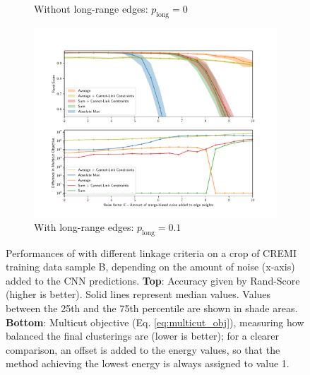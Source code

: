 \begin{figure}
\begin{subfigure}[t]{0.49 \textwidth}
        \caption{Without long-range edges: $p_{\mathrm{long}}=0$} \label{fig:merge_noise_only_direct}
    \end{subfigure} \hfill
    \begin{subfigure}[t]{0.49 \textwidth}
        \centering
        \includegraphics[width=\textwidth,trim=0.53in 0.35in 0.65in 0.80in,clip]{./figs/merge_noise_long_range.pdf}
        \caption{With long-range edges: $p_{\mathrm{long}}=0.1$} \label{fig:merge_noise_with_long_range}
    \end{subfigure}
\caption{Performances of \algname{} with different linkage criteria on a crop of CREMI training data sample B, depending on the amount of noise (x-axis) added to the CNN predictions. \textbf{Top}: Accuracy given by Rand-Score (higher is better). Solid lines represent median values. Values between the 25th and the 75th percentile are shown in shade areas. \textbf{Bottom}: Multicut objective (Eq. \ref{eq:multicut_obj}), measuring how balanced the final clusterings are (lower is better); for a clearer comparison, an offset is added to the energy values, so that the method achieving the lowest energy is always assigned to value 1.   
}\label{fig:noise_plots}
\end{figure}


